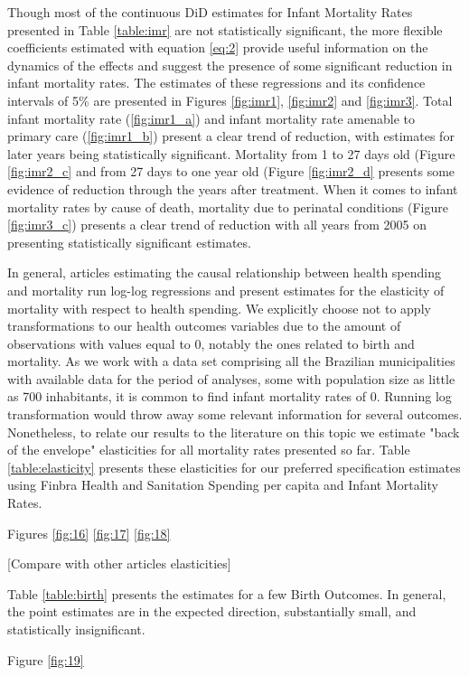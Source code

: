 Though most of the continuous DiD estimates for Infant Mortality Rates presented in Table \ref{table:imr} are not statistically significant, the more flexible coefficients estimated with equation \ref{eq:2} provide useful information on the dynamics of the effects and suggest the presence of some significant reduction in infant mortality rates. The estimates of these regressions and its confidence intervals of 5\% are presented in Figures \ref{fig:imr1}, \ref{fig:imr2} and \ref{fig:imr3}. Total infant mortality rate (\ref{fig:imr1_a}) and infant mortality rate amenable to primary care (\ref{fig:imr1_b}) present a clear trend of reduction, with estimates for later years being statistically significant. Mortality from 1 to 27 days old (Figure \ref{fig:imr2_c} and from 27 days to one year old (Figure \ref{fig:imr2_d} presents some evidence of reduction through the years after treatment. When it comes to infant mortality rates by cause of death, mortality due to perinatal conditions (Figure \ref{fig:imr3_c}) presents a clear trend of reduction with all years from 2005 on presenting statistically significant estimates.

In general, articles estimating the causal relationship between health spending and mortality run log-log regressions and present estimates for the elasticity of mortality with respect to health spending. We explicitly choose not to apply transformations to our health outcomes variables due to the amount of observations with values equal to 0, notably the ones related to birth and mortality. As we work with a data set comprising all the Brazilian municipalities with available data for the period of analyses, some with population size as little as 700 inhabitants, it is common to find infant mortality rates of 0. Running log transformation would throw away some relevant information for several outcomes. Nonetheless, to relate our results to the literature on this topic we estimate "back of the envelope" elasticities for all mortality rates presented so far. Table \ref{table:elasticity} presents these elasticities for our preferred specification estimates using Finbra Health and Sanitation Spending per capita and Infant Mortality Rates. 

Figures \ref{fig:16} \ref{fig:17} \ref{fig:18}










[Compare with other articles elasticities]


Table \ref{table:birth} presents the estimates for a few Birth Outcomes. In general, the point estimates are in the expected direction, substantially small, and statistically insignificant.      

Figure \ref{fig:19}





